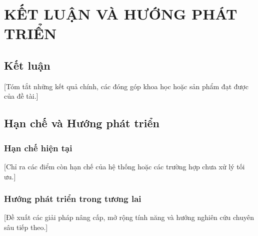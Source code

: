 \chapter{KẾT LUẬN VÀ HƯỚNG PHÁT TRIỂN}
\label{chap:conclusion}

\section{Kết luận}
\label{sec:conclusion}

[Tóm tắt những kết quả chính, các đóng góp khoa học hoặc sản phẩm đạt được của đề tài.]

\section{Hạn chế và Hướng phát triển}
\label{sec:future_work}

\subsection{Hạn chế hiện tại}
[Chỉ ra các điểm còn hạn chế của hệ thống hoặc các trường hợp chưa xử lý tối ưu.]

\subsection{Hướng phát triển trong tương lai}
[Đề xuất các giải pháp nâng cấp, mở rộng tính năng và hướng nghiên cứu chuyên sâu tiếp theo.]
